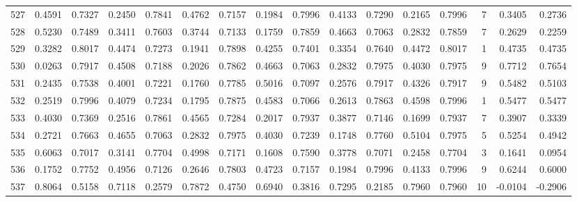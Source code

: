 \begin{tabular}{lrrrrrrrrrrrrrrr}
527 &      0.4591 &  0.7327 &  0.2450 &  0.7841 &  0.4762 &  0.7157 &  0.1984 &  0.7996 &  0.4133 &  0.7290 &   0.2165 &     0.7996 &      7 &                    0.3405 &                     0.2736 \\
528 &      0.5230 &  0.7489 &  0.3411 &  0.7603 &  0.3744 &  0.7133 &  0.1759 &  0.7859 &  0.4663 &  0.7063 &   0.2832 &     0.7859 &      7 &                    0.2629 &                     0.2259 \\
529 &      0.3282 &  0.8017 &  0.4474 &  0.7273 &  0.1941 &  0.7898 &  0.4255 &  0.7401 &  0.3354 &  0.7640 &   0.4472 &     0.8017 &      1 &                    0.4735 &                     0.4735 \\
530 &      0.0263 &  0.7917 &  0.4508 &  0.7188 &  0.2026 &  0.7862 &  0.4663 &  0.7063 &  0.2832 &  0.7975 &   0.4030 &     0.7975 &      9 &                    0.7712 &                     0.7654 \\
531 &      0.2435 &  0.7538 &  0.4001 &  0.7221 &  0.1760 &  0.7785 &  0.5016 &  0.7097 &  0.2576 &  0.7917 &   0.4326 &     0.7917 &      9 &                    0.5482 &                     0.5103 \\
532 &      0.2519 &  0.7996 &  0.4079 &  0.7234 &  0.1795 &  0.7875 &  0.4583 &  0.7066 &  0.2613 &  0.7863 &   0.4598 &     0.7996 &      1 &                    0.5477 &                     0.5477 \\
533 &      0.4030 &  0.7369 &  0.2516 &  0.7861 &  0.4565 &  0.7284 &  0.2017 &  0.7937 &  0.3877 &  0.7146 &   0.1699 &     0.7937 &      7 &                    0.3907 &                     0.3339 \\
534 &      0.2721 &  0.7663 &  0.4655 &  0.7063 &  0.2832 &  0.7975 &  0.4030 &  0.7239 &  0.1748 &  0.7760 &   0.5104 &     0.7975 &      5 &                    0.5254 &                     0.4942 \\
535 &      0.6063 &  0.7017 &  0.3141 &  0.7704 &  0.4998 &  0.7171 &  0.1608 &  0.7590 &  0.3778 &  0.7071 &   0.2458 &     0.7704 &      3 &                    0.1641 &                     0.0954 \\
536 &      0.1752 &  0.7752 &  0.4956 &  0.7126 &  0.2646 &  0.7803 &  0.4723 &  0.7157 &  0.1984 &  0.7996 &   0.4133 &     0.7996 &      9 &                    0.6244 &                     0.6000 \\
537 &      0.8064 &  0.5158 &  0.7118 &  0.2579 &  0.7872 &  0.4750 &  0.6940 &  0.3816 &  0.7295 &  0.2185 &   0.7960 &     0.7960 &     10 &                   -0.0104 &                    -0.2906 \\

\end{tabular}

